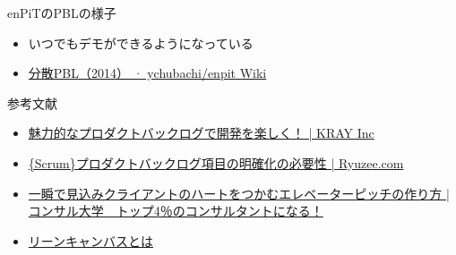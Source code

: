 \documentclass[t]{beamer}
\begin{document}
\begin{frame}[label=sec-12]{enPiTのPBLの様子}
\begin{itemize}
\item いつでもデモができるようになっている
\item \href{https://github.com/ychubachi/enpit/wiki/\%E5\%88\%86\%E6\%95\%A3PBL\%EF\%BC\%882014\%EF\%BC\%89}{分散PBL（2014） · ychubachi/enpit Wiki}
\end{itemize}
\end{frame}

\begin{frame}[label=sec-13]{参考文献}
\begin{itemize}
\item \href{http://kray.jp/blog/attractive-product-backlog/}{魅力的なプロダクトバックログで開発を楽しく！ | KRAY Inc}
\item \href{http://www.ryuzee.com/contents/blog/5024}{\{Scrum\}プロダクトバックログ項目の明確化の必要性 | Ryuzee.com}
\item \href{http://master-consultant.jp/\%E3\%82\%A8\%E3\%83\%AC\%E3\%83\%99\%E3\%83\%BC\%E3\%82\%BF\%E3\%83\%BC\%E3\%83\%94\%E3\%83\%83\%E3\%83\%81\%E3\%81\%AE\%E4\%BD\%9C\%E3\%82\%8A\%E6\%96\%B9/}{一瞬で見込みクライアントのハートをつかむエレベーターピッチの作り方 | コンサル大学　トップ4％のコンサルタントになる！}
\item \href{http://www.slideshare.net/studytech/ss-23454300}{リーンキャンバスとは}
\end{itemize}
\end{frame}
\end{document}
